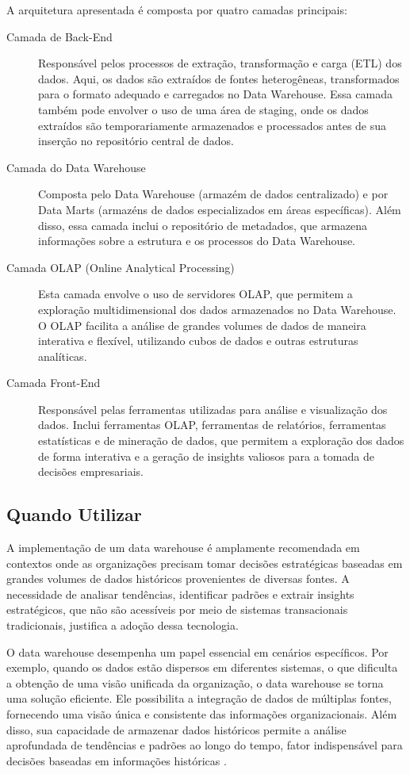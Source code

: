 A arquitetura apresentada é composta por quatro camadas principais:
\begin{description}
    \item[Camada de Back-End] Responsável pelos processos de extração, transformação e carga (ETL) dos dados. Aqui, os dados são extraídos 
    de fontes heterogêneas, transformados para o formato adequado e carregados no Data Warehouse. Essa camada também pode envolver o uso de 
    uma área de staging, onde os dados extraídos são temporariamente armazenados e processados antes de sua inserção no repositório central 
    de dados.
    \item[Camada do Data Warehouse] Composta pelo Data Warehouse (armazém de dados centralizado) e por Data Marts (armazéns de dados 
    especializados em áreas específicas). Além disso, essa camada inclui o repositório de metadados, que armazena informações sobre 
    a estrutura e os processos do Data Warehouse.
    \item[Camada OLAP (Online Analytical Processing)] Esta camada envolve o uso de servidores OLAP, que permitem a exploração multidimensional 
    dos dados armazenados no Data Warehouse. O OLAP facilita a análise de grandes volumes de dados de maneira interativa e flexível, utilizando 
    cubos de dados e outras estruturas analíticas.
    \item[Camada Front-End] Responsável pelas ferramentas utilizadas para análise e visualização dos dados. Inclui ferramentas OLAP, ferramentas 
    de relatórios, ferramentas estatísticas e de mineração de dados, que permitem a exploração dos dados de forma interativa e a geração de 
    insights valiosos para a tomada de decisões empresariais.
\end{description}
\cite{vaisman2014data}

\subsection{Quando Utilizar}
A implementação de um data warehouse é amplamente recomendada em contextos onde as organizações precisam tomar decisões estratégicas baseadas 
em grandes volumes de dados históricos provenientes de diversas fontes. A necessidade de analisar tendências, identificar padrões e extrair 
insights estratégicos, que não são acessíveis por meio de sistemas transacionais tradicionais, justifica a adoção dessa tecnologia.

O data warehouse desempenha um papel essencial em cenários específicos. Por exemplo, quando os dados estão dispersos em diferentes sistemas, 
o que dificulta a obtenção de uma visão unificada da organização, o data warehouse se torna uma solução eficiente. Ele possibilita a integração 
de dados de múltiplas fontes, fornecendo uma visão única e consistente das informações organizacionais. Além disso, sua capacidade de armazenar 
dados históricos permite a análise aprofundada de tendências e padrões ao longo do tempo, fator indispensável para decisões baseadas em informações 
históricas \cite{santoso2017data}.

